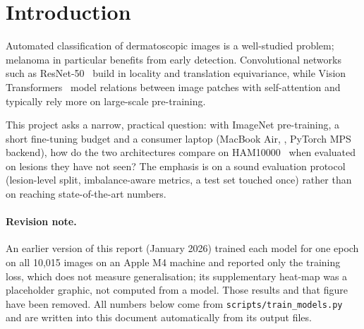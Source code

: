 \section{Introduction}
Automated classification of dermatoscopic images is a well-studied problem; melanoma in particular benefits from early detection.
Convolutional networks such as ResNet-50~\cite{he2016deep} build in locality and translation equivariance, while Vision Transformers~\cite{dosovitskiy2021image} model relations between image patches with self-attention and typically rely more on large-scale pre-training.

This project asks a narrow, practical question: with ImageNet pre-training, a short fine-tuning budget and a consumer laptop (MacBook Air, \hardware, PyTorch MPS backend), how do the two architectures compare on HAM10000~\cite{tschandl2018ham10000} when evaluated on lesions they have not seen?
The emphasis is on a sound evaluation protocol (lesion-level split, imbalance-aware metrics, a test set touched once) rather than on reaching state-of-the-art numbers.

\paragraph{Revision note.}
An earlier version of this report (January 2026) trained each model for one epoch on all 10,015 images on an Apple M4 machine and reported only the training loss, which does not measure generalisation; its supplementary heat-map was a placeholder graphic, not computed from a model.
Those results and that figure have been removed.
All numbers below come from \texttt{scripts/train\_models.py} and are written into this document automatically from its output files.
